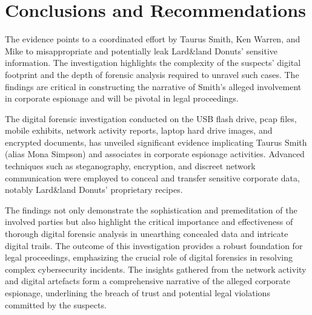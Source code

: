 \section*{Conclusions and Recommendations}

The evidence points to a coordinated effort by Taurus Smith, Ken Warren, and Mike to misappropriate and potentially leak Lard\&land Donuts' sensitive information. The investigation highlights the complexity of the suspects' digital footprint and the depth of forensic analysis required to unravel such cases. The findings are critical in constructing the narrative of Smith's alleged involvement in corporate espionage and will be pivotal in legal proceedings.

The digital forensic investigation conducted on the USB flash drive, pcap files, mobile exhibits, network activity reports, laptop hard drive images, and encrypted documents, has unveiled significant evidence implicating Taurus Smith (alias Mona Simpson) and associates in corporate espionage activities. Advanced techniques such as steganography, encryption, and discreet network communication were employed to conceal and transfer sensitive corporate data, notably Lard\&land Donuts' proprietary recipes.

The findings not only demonstrate the sophistication and premeditation of the involved parties but also highlight the critical importance and effectiveness of thorough digital forensic analysis in unearthing concealed data and intricate digital trails. The outcome of this investigation provides a robust foundation for legal proceedings, emphasizing the crucial role of digital forensics in resolving complex cybersecurity incidents. The insights gathered from the network activity and digital artefacts form a comprehensive narrative of the alleged corporate espionage, underlining the breach of trust and potential legal violations committed by the suspects.